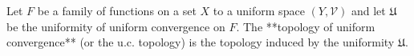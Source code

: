 Let $F$ be a family of functions on a set $X$ to a uniform space $(Y, \mathcal{V})$ and let $\mathfrak{U}$ be the uniformity of uniform convergence on $F$. The **topology of uniform convergence** (or the u.c. topology) is the topology induced by the uniformity $\mathfrak{U}$.
